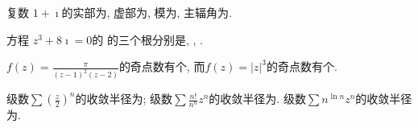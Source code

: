 \documentclass{njustexam}
\begin{document}
\renewcommand{\course}{数学物理方法}                          %
\renewcommand{\duration}{120}                                            %
\renewcommand{\credit}{5}                                                   %
\renewcommand{\syllabus}{11044102}                               %
\renewcommand{\fullmark}{100}                                            %
\renewcommand{\composer}{罗凯}            %
\renewcommand{\composedate}{2024年12月31日}                   %
\renewcommand{\validator}{}                                        %
\renewcommand{\coursetype}{1}                                            %
\renewcommand{\exammethod}{1}                                         %
\renewcommand{\testpaper}{A}                                              %

\makehead %


\begin{problem}
 复数 $1 + \imath $的实部为,  虚部为,  
 模为, 主辐角为. 
\end{problem}


\begin{problem}
方程 $z^3 + 8 \imath = 0$的
的三个根分别是\fillout{$2 \imath$}, 
, 
. 
\end{problem}



\begin{problem}
$f(z)=\frac{\pi}{(z-1)^2(z-2)}$的奇点数有个, 而$f(z)=|z|^3$的奇点数有个. 
\end{problem}



\begin{problem}
  级数$\sum (\frac{z}{2})^n$的收敛半径为;
  级数$\sum \frac{n !}{n^n} z^n$的收敛半径为. 
  级数$\sum n^{\ln{n}} z^n$的收敛半径为. 
 \end{problem}
\end{document}
